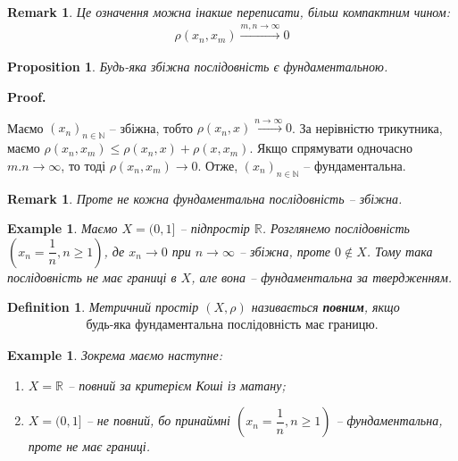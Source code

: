 \documentclass[a4paper, 10pt]{article}
\makeatletter
\theoremstyle{theoremdd}
\theoremstyle{theoremdd}
\newtheorem{definition}[theorem]{Definition}
\theoremstyle{theoremdd}
\theoremstyle{theoremdd}
\newtheorem{example}[theorem]{Example}
\theoremstyle{theoremdd}
\newtheorem{proposition}[theorem]{Proposition}
\theoremstyle{theoremdd}
\newtheorem{remark}[theorem]{Remark}
\theoremstyle{theoremdd}
\theoremstyle{theoremdd}
\renewenvironment{proof}[1][Proof.\\]{\par
\pushQED{\hfill \qed}%
\normalfont \topsep6\p@\@plus6\p@\relax
\trivlist
\item\relax
{\bfseries
#1\@addpunct{.}}\hspace\labelsep\ignorespaces
}{%
\popQED\endtrivlist\@endpefalse
}
\makeatother
\begin{document}
\begin{remark}
Це означення можна інакше переписати, більш компактним чином:
\begin{align*}
\rho(x_n,x_m) \overset{m,n \to \infty}{\longrightarrow} 0
\end{align*}
\end{remark}

\begin{proposition}
Будь-яка збіжна послідовність є фундаментальною.
\end{proposition}

\begin{proof}
Маємо $(x_n)_{n \in \mathbb{N}}$ -- збіжна, тобто $\rho(x_n,x) \overset{n \to \infty}{\longrightarrow} 0$. За нерівністю трикутника, маємо $\rho(x_n,x_m) \leq \rho(x_n,x) + \rho(x,x_m)$. Якщо спрямувати одночасно $m.n \to \infty$, то тоді $\rho(x_n,x_m) \to 0$. Отже, $(x_n)_{n \in \mathbb{N}}$ -- фундаментальна.
\end{proof}

\begin{remark}
Проте не кожна фундаментальна послідовність -- збіжна.
\end{remark}

\begin{example}
Маємо $X = (0,1]$ -- підпростір $\mathbb{R}$. Розглянемо послідовність $\left( x_n = \dfrac{1}{n}, n \geq 1 \right)$, де $x_n \to 0$ при $n \to \infty$ -- збіжна, проте $0 \notin X$. Тому така послідовність не має границі в $X$, але вона -- фундаментальна за твердженням.
\end{example}

\begin{definition}
Метричний простір $(X, \rho)$ називається \textbf{повним}, якщо 
\begin{align*}
\text{будь-яка фундаментальна послідовність має границю.}
\end{align*}
\end{definition}

\begin{example} 
Зокрема маємо наступне:
\begin{enumerate}[nosep,wide=0pt,label={\arabic*)}]
\item $X = \mathbb{R}$ -- повний за критерієм Коші із матану;
\item $X = (0,1]$ -- не повний, бо принаймні $\left(x_n = \dfrac{1}{n}, n \geq 1 \right)$ -- фундаментальна, проте не має границі.
\end{enumerate}
\end{example}
\end{document}
